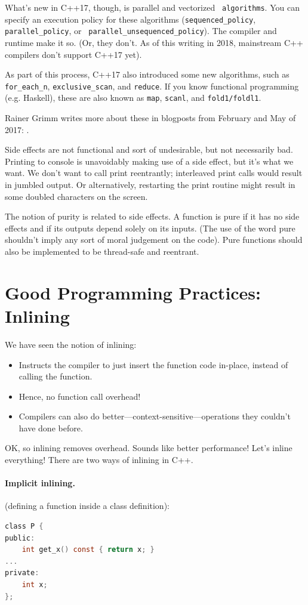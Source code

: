 \documentclass[a4paper]{report}
\begin{document}
What's new in C++17, though, is parallel and vectorized {\tt
algorithms}. You can specify an execution policy for these algorithms
({\tt sequenced\_policy}, {\tt parallel\_policy}, or {\tt
parallel\_unsequenced\_policy}). The compiler and runtime make it
so. (Or, they don't. As of this writing in 2018, mainstream C++
compilers don't support C++17 yet).

As part of this process, C++17 also introduced some new algorithms, such as
{\tt for\_each\_n}, {\tt exclusive\_scan}, and {\tt reduce}.
If you know functional programming (e.g. Haskell), these are also known as
{\tt map}, {\tt scanl}, and {\tt fold1/foldl1}.

Rainer Grimm writes more about these in blogposts from February and May of 2017:
\cite{grimm17:_paral_algor_stand_templ_librar} \cite{grimm17:_c}.

Side effects are not functional and sort of undesirable, but not necessarily bad. Printing to console is unavoidably making use of a side effect, but it's what we want. We don't want to call print reentrantly; interleaved print calls would result in jumbled output. Or alternatively, restarting the print routine might result in some doubled characters on the screen.

The notion of purity is related to side effects. A function is pure if it has no side effects and if its outputs depend solely on its inputs. (The use of the word pure shouldn't imply any sort of moral judgement on the code). Pure functions should also be implemented to be thread-safe and reentrant.


\section*{Good Programming Practices: Inlining}
We have seen the notion of inlining:
  \begin{itemize}
    \item Instructs the compiler to just insert the function code in-place,
      instead of calling the function.
    \item Hence, no function call overhead!
    \item Compilers can also do better---context-sensitive---operations they couldn't
      have done before.
  \end{itemize}

OK, so inlining removes overhead. Sounds like better performance! Let's inline everything!
There are two ways of inlining in C++.

\paragraph{Implicit inlining.} (defining a function inside a class definition):
  \begin{lstlisting}[language=C]
class P {
public:
    int get_x() const { return x; }
...
private:
    int x;
};
  \end{lstlisting}
\end{document}
